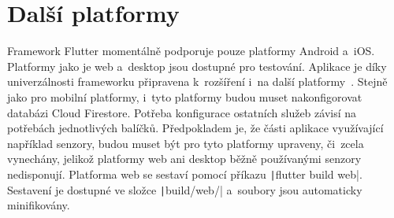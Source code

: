 \section{Další platformy}

Framework Flutter momentálně podporuje pouze platformy Android a~iOS.
Platformy jako je web a~desktop jsou dostupné pro testování.
Aplikace je díky univerzálnosti frameworku připravena k~rozšíření i~na další
platformy~\cite{flutter_deploy_web}.
Stejně jako pro mobilní platformy,
i~tyto platformy budou muset nakonfigorovat databázi Cloud Firestore.
Potřeba konfigurace ostatních služeb závisí na potřebách jednotlivých balíčků.
Předpokladem je,
že části aplikace využívající například senzory,
budou muset být pro tyto platformy upraveny,
či~zcela vynechány,
jelikož platformy web ani desktop běžně používanými senzory nedisponují.
Platforma web se sestaví pomocí příkazu \texttt|flutter build web|.
Sestavení je dostupné ve složce \texttt|build/web/|
a~soubory jsou automaticky minifikovány.
